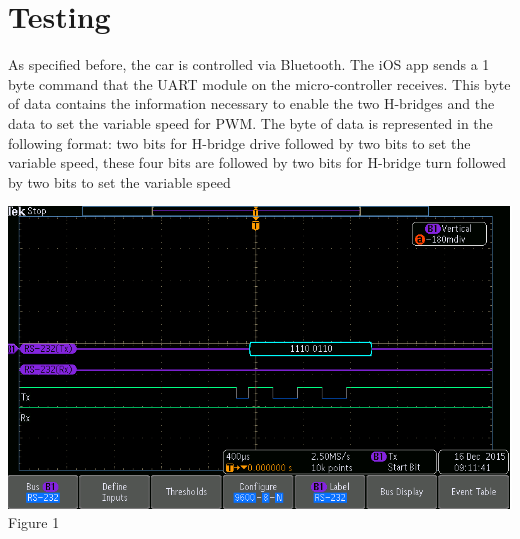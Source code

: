 \documentclass[12pt]{article}
\begin{document}
\section{Testing}
As specified before, the car is controlled via Bluetooth. The iOS app sends a 1 byte command that the UART module on the micro-controller receives. This byte of data contains the information necessary to enable the two H-bridges and the data to set the variable speed for PWM. The byte of data is represented in the following format: two bits for H-bridge drive followed by two bits to set the variable speed, these four bits are followed by two bits for H-bridge turn followed by two bits to set the variable speed\\

\begin {center}
\includegraphics[scale=.75]{uart-message}
\\
Figure 1	
\end {center}
\end{document}
